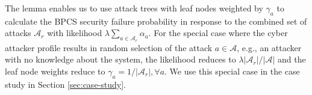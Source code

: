 \documentclass[journal]{IEEEtran}
\begin{document}
The lemma enables us to use attack trees with leaf nodes weighted by $\gamma_a$ to calculate the BPCS security failure probability in response to the combined set of attacks $\mathcal{A}_r$ with likelihood $\lambda \sum_{a \in \mathcal{A}_r} \alpha_a$. For the special case where the cyber attacker profile results in random selection of the attack $a \in \mathcal{A}$, e.g., an attacker with no knowledge about the system, the likelihood reduces to $\lambda |\mathcal{A}_r|/|\mathcal{A}|$ and the leaf node weights reduce to $\gamma_a = 1/|\mathcal{A}_r|, \forall a$. We use this special case in the case study in Section \ref{sec:case-study}.
\end{document}
